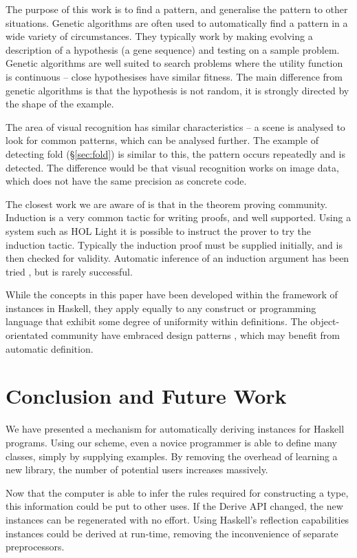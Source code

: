 \documentclass{llncs}
\begin{document}
The purpose of this work is to find a pattern, and generalise the pattern to other situations. Genetic algorithms are often used to automatically find a pattern in a wide variety of circumstances. They typically work by making evolving a description of a hypothesis (a gene sequence) and testing on a sample problem. Genetic algorithms are well suited to search problems where the utility function is continuous -- close hypothesises have similar fitness. The main difference from genetic algorithms is that the hypothesis is not random, it is strongly directed by the shape of the example.

The area of visual recognition has similar characteristics -- a scene is analysed to look for common patterns, which can be analysed further. The example of detecting fold (\S\ref{sec:fold}) is similar to this, the pattern occurs repeatedly and is detected. The difference would be that visual recognition works on image data, which does not have the same precision as concrete code.

The closest work we are aware of is that in the theorem proving community. Induction is a very common tactic for writing proofs, and well supported. Using a system such as HOL Light \cite{hol_light} it is possible to instruct the prover to try the induction tactic. Typically the induction proof must be supplied initially, and is then checked for validity. Automatic inference of an induction argument has been tried \cite{minchev}, but is rarely successful.

While the concepts in this paper have been developed within the framework of instances in Haskell, they apply equally to any construct or programming language that exhibit some degree of uniformity within definitions. The object-orientated community have embraced design patterns \cite{design patterns}, which may benefit from automatic definition.

\section{Conclusion and Future Work}
\label{sec:conclusion}

We have presented a mechanism for automatically deriving instances for Haskell programs. Using our scheme, even a novice programmer is able to define many classes, simply by supplying examples. By removing the overhead of learning a new library, the number of potential users increases massively.

Now that the computer is able to infer the rules required for constructing a type, this information could be put to other uses. If the Derive API changed, the new instances can be regenerated with no effort. Using Haskell's reflection capabilities instances could be derived at run-time, removing the inconvenience of separate preprocessors.




\end{document}

